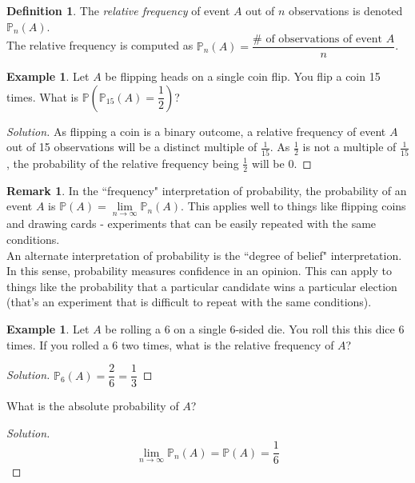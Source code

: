 \documentclass[12pt]{article}
\newcommand{\bbP}{\mathbb{P}}
\renewcommand{\_}[1]{\underline{ #1 }}
\theoremstyle{definition}
\newtheorem{definition}[theorem]{Definition}
\newtheorem{example}[theorem]{Example}
\newtheorem{remark}[theorem]{Remark}
\numberwithin{equation}{subsection}
\begin{document}
\begin{definition}
	The \emph{relative frequency} of event $A$ out of $n$ observations is denoted $\bbP_n(A)$. \\
	The relative frequency is computed as $\bbP_n(A)=\dfrac{\# \text{ of observations of event }A}{n}$.\\
\end{definition}

\begin{example}
	Let $A$ be flipping heads on a single coin flip. You flip a coin 15 times. What is $\bbP\left(\bbP_{15}(A)=\dfrac{1}{2}\right)$?
		\begin{proof}[Solution] 
		As flipping a coin is a binary outcome, a relative frequency of event $A$ out of 15 observations will be a distinct multiple of $\frac{1}{15}$. As $\frac{1}{2}$ is not a multiple of $\frac{1}{15}$, the probability of the relative frequency being $\frac{1}{2}$ will be 0.
		\end{proof}
\end{example}

\begin{remark}
	In the ``frequency" interpretation of probability, the probability of an event $A$ is $\bbP(A)=\lim\limits_{n\to\infty}\bbP_n(A)$. This applies well to things like flipping coins and drawing cards - experiments that can be easily repeated with the same conditions. \\
	An alternate interpretation of probability is the ``degree of belief" interpretation. In this sense, probability measures confidence in an opinion. This can apply to things like the probability that a particular candidate wins a particular election (that's an experiment that is difficult to repeat with the same conditions).
\end{remark}

\begin{example}
 Let $A$ be rolling a 6 on a single 6-sided die. You roll this this dice 6 times. If you rolled a 6 two times, what is the relative frequency of $A$?
	\begin{proof}[Solution] 
	$\bbP_{6}(A)=\dfrac{2}{6}=\dfrac{1}{3}$
	\end{proof}
What is the absolute probability of $A$?
	\begin{proof}[Solution] 
	\[\lim_{n\to \infty}\bbP_n(A)=\bbP(A)=\frac{1}{6}\]
	\end{proof}
\end{example}
\end{document}
